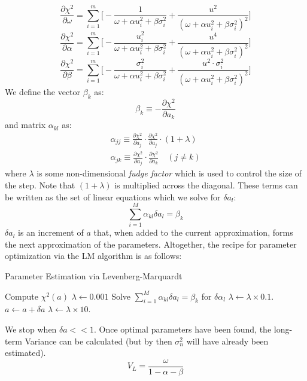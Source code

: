 \documentclass[../background_research.tex]{subfiles}
\begin{document}
\begin{equation}
	\label{eqn:partialomega}
	\frac{\partial\chi^2}{\partial\omega}=\sum_{i=1}^m\Bigg[-\frac{1}{\omega+\alpha{u^2_i}+\beta\sigma^2_i}+\frac{u^2}{(\omega+\alpha{u^2_i}+\beta\sigma^2_i)^2}\Bigg]
\end{equation}
\begin{equation}
	\label{eqn:partialalpha}
	\frac{\partial\chi^2}{\partial\alpha}=\sum_{i=1}^m\Bigg[-\frac{u^2_i}{\omega+\alpha{u^2_i}+\beta\sigma^2_i}+\frac{u^4}{(\omega+\alpha{u^2_i}+\beta\sigma^2_i)^2}\Bigg]
\end{equation}
\begin{equation}
	\label{eqn:partialbeta}
	\frac{\partial\chi^2}{\partial\beta}=\sum_{i=1}^m\Bigg[-\frac{\sigma^2_i}{\omega+\alpha{u^2_i}+\beta\sigma^2_i}+\frac{u^2\cdot{\sigma^2_i}}{(\omega+\alpha{u^2_i}+\beta\sigma^2_i)^2}\Bigg]
\end{equation}
We define the vector $\beta_k$ as:
\begin{equation}
	\label{eqn:betavector}
	\beta_k\equiv -\frac{\partial\chi^2}{\partial{a_k}}
\end{equation}
and matrix $\alpha_{kl}$ as:
\begin{equation}
	\begin{split}
		\label{eqn:alphamatrix}
		\alpha_{jj}\equiv \frac{\partial\chi^2}{\partial{a_j}}	\cdot \frac{\partial\chi^2}{\partial{a_j}}\cdot(1+\lambda)\\
		\alpha_{jk}\equiv \frac{\partial\chi^2}{\partial{a_j}}	\cdot \frac{\partial\chi^2}{\partial{a_k}}\quad(j\neq{k})
	\end{split}
\end{equation}
where $\lambda$ is some non-dimensional \textit{fudge factor} which is used to control the size of the step.
Note that $(1+\lambda)$ is multiplied across the diagonal.
These terms can be written as the set of linear equations which we solve for $\delta{a_l}$:
\begin{equation}
	\label{eqn:linear}
	\sum_{i=1}^M{\alpha_{kl}}\delta{a_l}=\beta_k
\end{equation}
$\delta{a_l}$ is an increment of $a$ that, when added to the current approximation, forms the next approximation of the parameters.
Altogether, the recipe for parameter optimization via the LM algorithm is as follows:
\begin{algorithm}[H]
	\caption{Parameter Estimation via Levenberg-Marquardt}
	\begin{algorithmic}[1]
		\label{alg:lm}
		\State Compute $\chi^2(a)$
		\State $\lambda \gets 0.001$
		\State Solve $\sum_{i=1}^M{\alpha_{kl}}\delta{a_l}=\beta_k$ for $\delta{\alpha_l}$
		\State $\lambda \gets \lambda \times 0.1$.
		\State $a \gets a + \delta{a}$
		\Else $\lambda \gets \lambda \times 10$.
		\EndIf
		\EndWhile
		\EndProcedure
	\end{algorithmic}
\end{algorithm}
We stop when $\delta{a}<<1$.
Once optimal parameters have been found, the long-term Variance can be calculated (but by then $\sigma^2_n$ will have already been estimated).
\begin{equation}
	\label{eqn:longVariance}
	V_L=\frac{\omega}{1-\alpha-\beta}
\end{equation}
\end{document}

